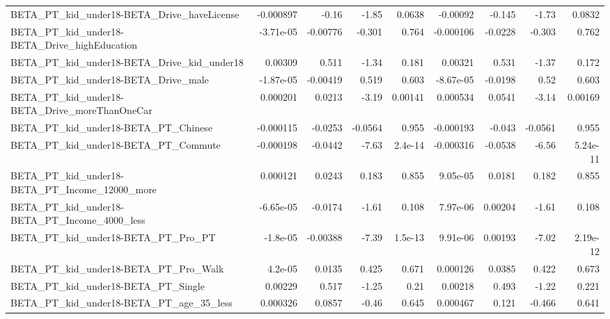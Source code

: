 \begin{tabular}{lrrrrrrrr}
BETA\_PT\_kid\_under18-BETA\_Drive\_haveLicense         &   -0.000897 &        -0.16 &     -1.85 &   0.0638 &   -0.00092 &      -0.145 &        -1.73 &        0.0832 \\
BETA\_PT\_kid\_under18-BETA\_Drive\_highEducation       &   -3.71e-05 &     -0.00776 &    -0.301 &    0.764 &  -0.000106 &     -0.0228 &       -0.303 &         0.762 \\
BETA\_PT\_kid\_under18-BETA\_Drive\_kid\_under18         &     0.00309 &        0.511 &     -1.34 &    0.181 &    0.00321 &       0.531 &        -1.37 &         0.172 \\
BETA\_PT\_kid\_under18-BETA\_Drive\_male                &   -1.87e-05 &     -0.00419 &     0.519 &    0.603 &  -8.67e-05 &     -0.0198 &         0.52 &         0.603 \\
BETA\_PT\_kid\_under18-BETA\_Drive\_moreThanOneCar      &    0.000201 &       0.0213 &     -3.19 &  0.00141 &   0.000534 &      0.0541 &        -3.14 &       0.00169 \\
BETA\_PT\_kid\_under18-BETA\_PT\_Chinese                &   -0.000115 &      -0.0253 &   -0.0564 &    0.955 &  -0.000193 &      -0.043 &      -0.0561 &         0.955 \\
BETA\_PT\_kid\_under18-BETA\_PT\_Commute                &   -0.000198 &      -0.0442 &     -7.63 &  2.4e-14 &  -0.000316 &     -0.0538 &        -6.56 &      5.24e-11 \\
BETA\_PT\_kid\_under18-BETA\_PT\_Income\_12000\_more      &    0.000121 &       0.0243 &     0.183 &    0.855 &   9.05e-05 &      0.0181 &        0.182 &         0.855 \\
BETA\_PT\_kid\_under18-BETA\_PT\_Income\_4000\_less       &   -6.65e-05 &      -0.0174 &     -1.61 &    0.108 &   7.97e-06 &     0.00204 &        -1.61 &         0.108 \\
BETA\_PT\_kid\_under18-BETA\_PT\_Pro\_PT                 &    -1.8e-05 &     -0.00388 &     -7.39 &  1.5e-13 &   9.91e-06 &     0.00193 &        -7.02 &      2.19e-12 \\
BETA\_PT\_kid\_under18-BETA\_PT\_Pro\_Walk               &     4.2e-05 &       0.0135 &     0.425 &    0.671 &   0.000126 &      0.0385 &        0.422 &         0.673 \\
BETA\_PT\_kid\_under18-BETA\_PT\_Single                 &     0.00229 &        0.517 &     -1.25 &     0.21 &    0.00218 &       0.493 &        -1.22 &         0.221 \\
BETA\_PT\_kid\_under18-BETA\_PT\_age\_35\_less            &    0.000326 &       0.0857 &     -0.46 &    0.645 &   0.000467 &       0.121 &       -0.466 &         0.641 \\

\end{tabular}
